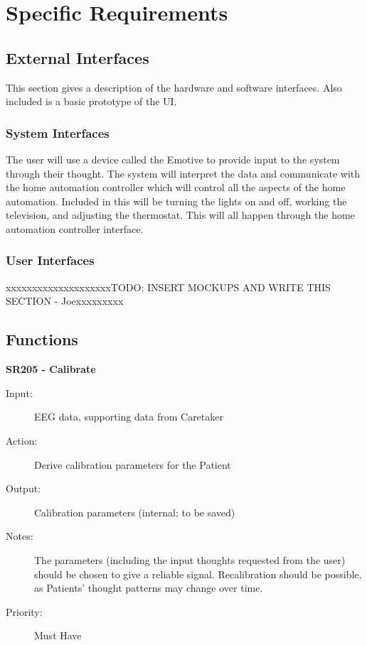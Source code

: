 \documentclass{article}
\begin{document}
\section{Specific Requirements}
\subsection{External Interfaces}
This section gives a description of the hardware and software interfaces. Also included is a basic prototype of the UI.

\subsubsection{System Interfaces}

The user will use a device called the Emotive to provide input to the system through their thought. The system will interpret the data and communicate with the home automation controller which will control all the aspects of the home automation. Included in this will be turning the lights on and off, working the television, and adjusting the thermostat. This will all happen through the home automation controller interface.

\subsubsection{User Interfaces}
{\color{red}xxxxxxxxxxxxxxxxxxxxTODO: INSERT MOCKUPS AND WRITE THIS SECTION - Joexxxxxxxxx}

\subsection{Functions}


\textbf{SR205 - Calibrate}
\begin{description}
    \item[Input:] EEG data, supporting data from Caretaker
    \item[Action:] Derive calibration parameters for the Patient
    \item[Output:] Calibration parameters (internal; to be saved)
    \item[Notes:] The parameters (including the input thoughts requested from
        the user) should be chosen to give a reliable signal. Recalibration
        should be possible, as Patients' thought patterns may change over
        time.
    \item[Priority:] Must Have
\end{description}
\end{document}
